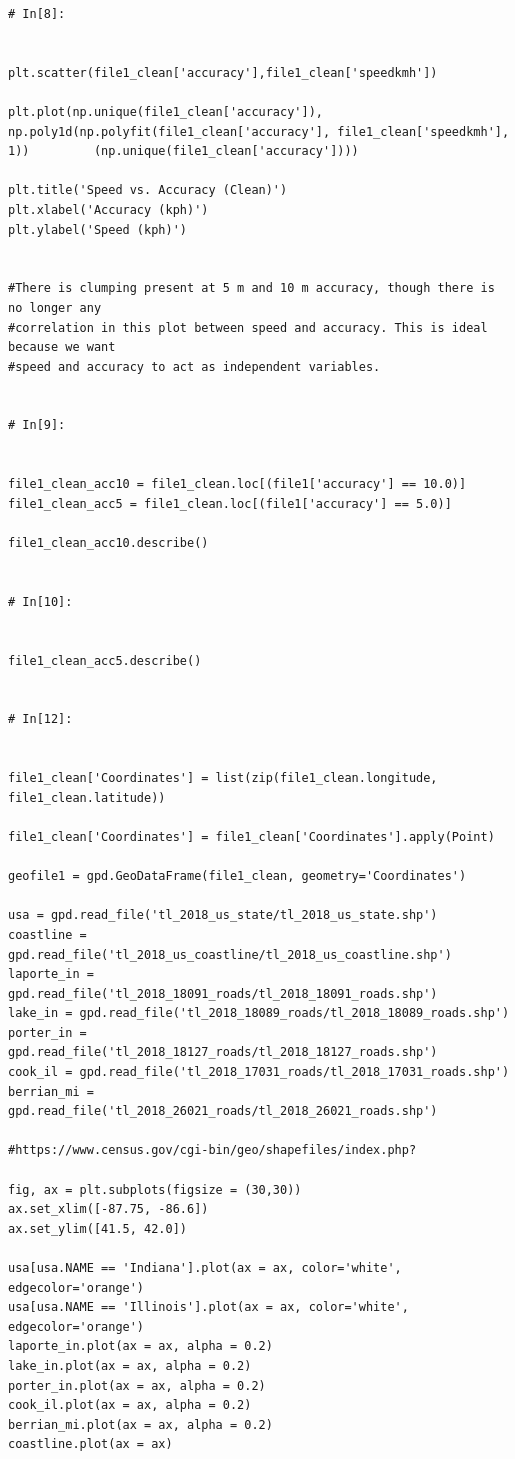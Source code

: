 \documentclass[12pt]{article}
\begin{document}
\begin{lstlisting}
# In[8]:


plt.scatter(file1_clean['accuracy'],file1_clean['speedkmh'])

plt.plot(np.unique(file1_clean['accuracy']),          np.poly1d(np.polyfit(file1_clean['accuracy'], file1_clean['speedkmh'], 1))         (np.unique(file1_clean['accuracy'])))

plt.title('Speed vs. Accuracy (Clean)')
plt.xlabel('Accuracy (kph)')
plt.ylabel('Speed (kph)')


#There is clumping present at 5 m and 10 m accuracy, though there is no longer any 
#correlation in this plot between speed and accuracy. This is ideal because we want 
#speed and accuracy to act as independent variables. 


# In[9]:


file1_clean_acc10 = file1_clean.loc[(file1['accuracy'] == 10.0)]
file1_clean_acc5 = file1_clean.loc[(file1['accuracy'] == 5.0)]

file1_clean_acc10.describe()


# In[10]:


file1_clean_acc5.describe()


# In[12]:


file1_clean['Coordinates'] = list(zip(file1_clean.longitude, file1_clean.latitude))

file1_clean['Coordinates'] = file1_clean['Coordinates'].apply(Point)

geofile1 = gpd.GeoDataFrame(file1_clean, geometry='Coordinates')

usa = gpd.read_file('tl_2018_us_state/tl_2018_us_state.shp')
coastline = gpd.read_file('tl_2018_us_coastline/tl_2018_us_coastline.shp')
laporte_in = gpd.read_file('tl_2018_18091_roads/tl_2018_18091_roads.shp')
lake_in = gpd.read_file('tl_2018_18089_roads/tl_2018_18089_roads.shp')
porter_in = gpd.read_file('tl_2018_18127_roads/tl_2018_18127_roads.shp')
cook_il = gpd.read_file('tl_2018_17031_roads/tl_2018_17031_roads.shp')
berrian_mi = gpd.read_file('tl_2018_26021_roads/tl_2018_26021_roads.shp')

#https://www.census.gov/cgi-bin/geo/shapefiles/index.php?

fig, ax = plt.subplots(figsize = (30,30))
ax.set_xlim([-87.75, -86.6])
ax.set_ylim([41.5, 42.0])

usa[usa.NAME == 'Indiana'].plot(ax = ax, color='white', edgecolor='orange')
usa[usa.NAME == 'Illinois'].plot(ax = ax, color='white', edgecolor='orange')
laporte_in.plot(ax = ax, alpha = 0.2)
lake_in.plot(ax = ax, alpha = 0.2)
porter_in.plot(ax = ax, alpha = 0.2)
cook_il.plot(ax = ax, alpha = 0.2)
berrian_mi.plot(ax = ax, alpha = 0.2)
coastline.plot(ax = ax)


\end{lstlisting}
\end{document}
